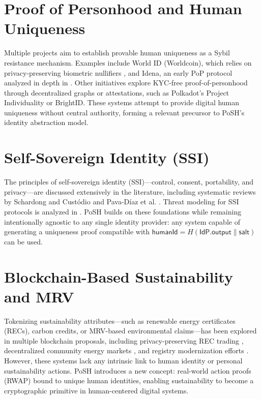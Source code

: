 \documentclass[11pt,a4paper]{report}
\theoremstyle{definition}
\theoremstyle{remark}
\begin{document}
\section{Proof of Personhood and Human Uniqueness}

Multiple projects aim to establish provable human uniqueness as a Sybil
resistance mechanism. Examples include World ID (Worldcoin), which relies on
privacy-preserving biometric nullifiers \cite{worldcoinWhitepaper}, and Idena,
an early PoP protocol analyzed in depth in \cite{ohlhaver2025compressed}. Other
initiatives explore KYC-free proof-of-personhood through decentralized graphs
or attestations, such as Polkadot's Project Individuality
\cite{polkadot2025individuality} or BrightID. These systems attempt to provide
digital human uniqueness without central authority, forming a relevant precursor
to PoSH’s identity abstraction model.

\section{Self-Sovereign Identity (SSI)}

The principles of self-sovereign identity (SSI)—control, consent, portability,
and privacy—are discussed extensively in the literature, including systematic
reviews by Schardong and Custódio \cite{schardong2022ssiSurvey} and Pava-Díaz
et al. \cite{pava2024ssiBlockchain}. Threat modeling for SSI protocols is
analyzed in \cite{pohn2024ssiThreats}. PoSH builds on these foundations while
remaining intentionally agnostic to any single identity provider: any system
capable of generating a uniqueness proof compatible with
$\mathsf{humanId} = H(\textsf{IdP.output} \parallel \textsf{salt})$ can be used.

\section{Blockchain-Based Sustainability and MRV}

Tokenizing sustainability attributes—such as renewable energy certificates
(RECs), carbon credits, or MRV-based environmental claims—has been explored in
multiple blockchain proposals, including privacy-preserving REC trading
\cite{energy2024recTrading}, decentralized community energy markets
\cite{fu2023recCommunity}, and registry modernization efforts
\cite{infosys2025blockchainREC,heliyon2025indonesiaREC}. However, these systems
lack any intrinsic link to human identity or personal sustainability actions.
PoSH introduces a new concept: real-world action proofs (RWAP) bound to unique
human identities, enabling sustainability to become a cryptographic primitive
in human-centered digital systems.
\end{document}
